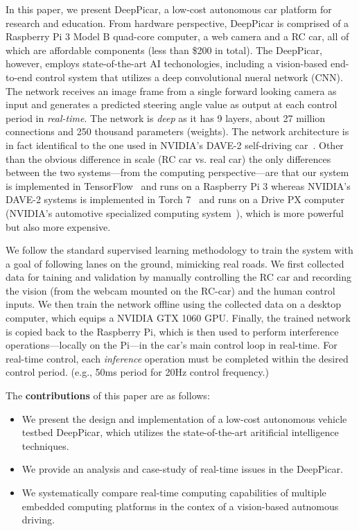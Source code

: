 In this paper, we present DeepPicar, a low-cost autonomous car
platform for research and education. From hardware perspective, 
DeepPicar is comprised of a Raspberry Pi 3 Model B quad-core
computer, a web camera and a RC car, all of which are affordable
components (less than \$200 in total).
The DeepPicar, however, employs state-of-the-art AI
techonologies, including a vision-based end-to-end control system that
utilizes a deep convolutional nueral network (CNN).
The network receives an image frame from a single forward
looking camera as input and generates a predicted steering angle
value as output at each control period in \emph{real-time}. 
The network is \emph{deep} as it has 9 layers, about 27 million connections
and 250 thousand parameters (weights).
The network architecture is in fact identifical to the one
used in NVIDIA's DAVE-2 self-driving car~\cite{Bojarski2016}. Other
than the obvious difference in scale (RC car vs. real car) the only
differences between the two systems---from the computing
perspective---are that our system is implemented in 
TensorFlow~\cite{abadi2016tensorflow} and runs on a 
Raspberry Pi 3 whereas NVIDIA's DAVE-2 systems is implemented in Torch
7~\cite{collobert2011torch7} and runs on a Drive PX computer (NVIDIA's
automotive specialized computing system~\cite{drivepx}), which is more
powerful but also more expensive.

We follow the standard supervised learning methodology to train the
system with a goal of following lanes on the ground, mimicking real
roads. We first collected data for taining and validation by manually 
controlling the RC car and recording the vision (from the webcam
mounted on the RC-car) and the human control inputs. We then train the
network offline using the collected data on a desktop computer, which
equips a NVIDIA GTX 1060 GPU. Finally, the trained network is copied
back to the Raspberry Pi, which is then used to perform interference
operations---locally on the Pi---in the car's main control loop in
real-time. For real-time control, each \emph{inference} operation must
be completed within the desired control period. (e.g., 50ms period for
20Hz control frequency.)


The {\bf contributions} of this paper are as follows:
\begin{itemize}
  \item We present the design and implementation of a
    low-cost autonomous vehicle testbed DeepPicar, which utilizes the
    state-of-the-art aritificial intelligence techniques.
  \item We provide an analysis and case-study of real-time issues in the
    DeepPicar.
  \item We systematically compare real-time computing capabilities of
    multiple embedded computing platforms in the contex of a
    vision-based autnomous driving.
\end{itemize}

